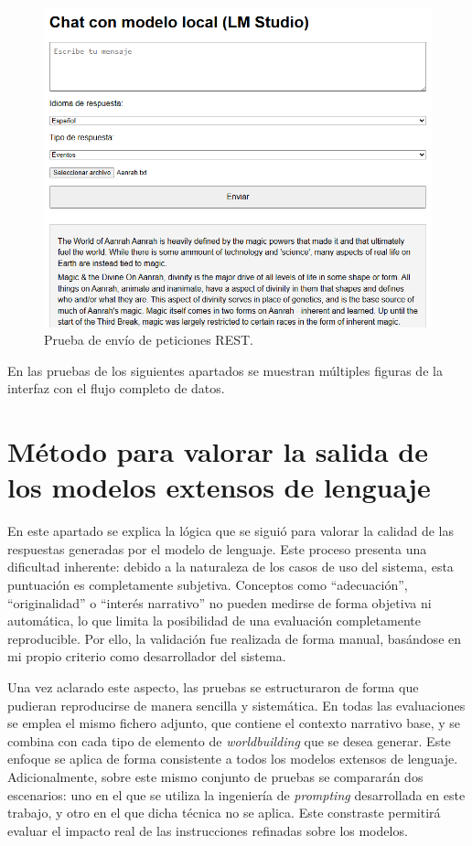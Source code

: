 \begin{figure}[htbp]
	\centering
	\includegraphics[width=1\textwidth]{./Figures/web-test.png}
	\caption{Prueba de envío de peticiones REST.}
	\label{fig:web-test}
\end{figure}

En las pruebas de los siguientes apartados se muestran múltiples figuras de la interfaz con el flujo completo de datos.

\section{Método para valorar la salida de los modelos extensos de lenguaje}
En este apartado se explica la lógica que se siguió para valorar la calidad de las respuestas
generadas por el modelo de lenguaje.
Este proceso presenta una dificultad inherente:
debido a la naturaleza de los casos de uso del sistema, esta puntuación es completamente subjetiva.
Conceptos como “adecuación”, “originalidad” o “interés narrativo” no pueden medirse de forma objetiva ni automática,
lo que limita la posibilidad de una evaluación completamente reproducible.
Por ello, la validación fue realizada de forma manual, basándose en mi propio criterio como desarrollador del sistema.

Una vez aclarado este aspecto, las pruebas se estructuraron de forma que pudieran reproducirse de manera sencilla y sistemática.
En todas las evaluaciones se emplea el mismo fichero adjunto, que contiene el contexto narrativo base,
y se combina con cada tipo de elemento de \textit{worldbuilding} que se desea generar.
Este enfoque se aplica de forma consistente a todos los modelos extensos de lenguaje.
Adicionalmente, sobre este mismo conjunto de pruebas se compararán dos escenarios:
uno en el que se utiliza la ingeniería de \textit{prompting} desarrollada en este trabajo,
y otro en el que dicha técnica no se aplica.
Este constraste permitirá evaluar el impacto real de las instrucciones
refinadas sobre los modelos.

